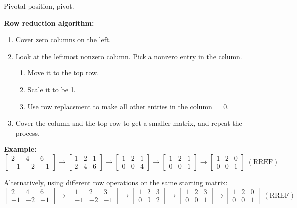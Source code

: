 \documentclass{article}
\begin{document}
\medskip

Pivotal position, pivot.

\newpage

\textbf{Row reduction algorithm:}
\begin{enumerate}
\item Cover zero columns on the left.
\item Look at the leftmost nonzero column. Pick a nonzero entry in the column.
\begin{enumerate}
\item Move it to the top row.
\item Scale it to be 1.
\item Use row replacement to make all other entries in the column $= 0$.
\end{enumerate}
\item Cover the column and the top row to get a smaller matrix, and repeat the process.
\end{enumerate}

\medskip

\textbf{Example:}
\[
\begin{bmatrix} 2 & 4 & 6 \\ -1 & -2 & -1 \end{bmatrix}
\to
\begin{bmatrix} 1 & 2 & 1 \\ 2 & 4 & 6 \end{bmatrix}
\to
\begin{bmatrix} 1 & 2 & 1 \\ 0 & 0 & 4 \end{bmatrix}
\to
\begin{bmatrix} 1 & 2 & 1 \\ 0 & 0 & 1 \end{bmatrix}
\to
\begin{bmatrix} 1 & 2 & 0 \\ 0 & 0 & 1 \end{bmatrix} \; (\text{RREF})
\]

Alternatively, using different row operations on the same starting matrix:
\[
\begin{bmatrix} 2 & 4 & 6 \\ -1 & -2 & -1 \end{bmatrix}
\to
\begin{bmatrix} 1 & 2 & 3 \\ -1 & -2 & -1 \end{bmatrix}
\to
\begin{bmatrix} 1 & 2 & 3 \\ 0 & 0 & 2 \end{bmatrix}
\to
\begin{bmatrix} 1 & 2 & 3 \\ 0 & 0 & 1 \end{bmatrix}
\to
\begin{bmatrix} 1 & 2 & 0 \\ 0 & 0 & 1 \end{bmatrix} \; (\text{RREF})
\]
\end{document}

